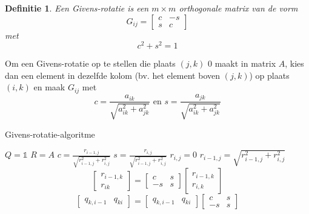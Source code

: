 \documentclass{article}
\newtheorem{mydef}{Definitie}
\begin{document}
	\begin{mydef}
		Een Givens-rotatie is een $m \times m$ orthogonale matrix van de vorm
		$$
		G_{ij} = 
		\begin{bmatrix}
			c & -s \\
			s &  c  
		\end{bmatrix}
		$$
		met
		$$ c^2 + s^2 = 1 $$
	\end{mydef}

	Om een Givens-rotatie op te stellen die plaats $(j,k)$ $0$ maakt in matrix $A$, kies dan een element in dezelfde kolom (bv. het element boven $(j,k)$) op plaats $(i,k)$ en maak $G_{ij}$ met
	$$ c = \frac{a_{ik}}{\sqrt{a_{ik}^2 + a_{jk}^2}} \text{ en } s = \frac{a_{jk}}{\sqrt{a_{ik}^2 + a_{jk}^2}}$$
	
	\pagebreak
	
	\begin{algorithm}[!ht]
		\caption{Givens-rotatie-algoritme}
		\begin{algorithmic}[1]
				\State $Q=\mathbb{1}$
				\State $R=A$
						\State $c = \frac{r_{i-1,j}}{\sqrt{r_{i-1,j}^2 + r_{i,j}^2}}$
						\State $s = \frac{r_{i,j}}{\sqrt{r_{i-1,j}^2 + r_{i,j}^2}}$
						\State $r_{i,j} = 0$
						\State $r_{i-1,j} = \sqrt{r_{i-1,j}^2 + r_{i,j}^2}$
							\State 
							$$
								\begin{bmatrix}
									r_{i-1,k} \\
									r_{ik}
								\end{bmatrix}
								=
								\begin{bmatrix}
									c & s \\
									-s & s
								\end{bmatrix}
								\begin{bmatrix}
									r_{i-1,k} \\
									r_{i,k}
								\end{bmatrix}
							$$
						\EndFor
							\State
							$$
								\begin{bmatrix}
									q_{k,i-1} & q_{ki}
								\end{bmatrix}
								=
								\begin{bmatrix}
									q_{k,i-1} & q_{ki}
								\end{bmatrix}
								\begin{bmatrix}
									c & s \\
									-s & s
								\end{bmatrix}
							$$
						\EndFor
					\EndFor
				\EndFor
			\EndProcedure
		\end{algorithmic}
	\end{algorithm}
\end{document}
